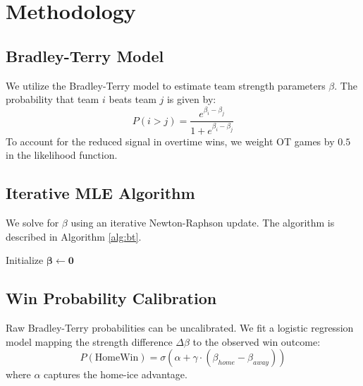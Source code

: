 \documentclass[conference]{IEEEtran}
\begin{document}
\section{Methodology}
\label{sec:method}

\subsection{Bradley-Terry Model}
We utilize the Bradley-Terry model \cite{bradley1952rank} to estimate team strength parameters $\beta$. The probability that team $i$ beats team $j$ is given by:
\begin{equation}
    P(i > j) = \frac{e^{\beta_i - \beta_j}}{1 + e^{\beta_i - \beta_j}}
    \label{eq:bt}
\end{equation}
To account for the reduced signal in overtime wins, we weight OT games by $0.5$ in the likelihood function.

\subsection{Iterative MLE Algorithm}
We solve for $\beta$ using an iterative Newton-Raphson update. The algorithm is described in Algorithm \ref{alg:bt}.

\begin{algorithm}[h]
\SetAlgoLined
{}
 Initialize $\boldsymbol{\beta} \leftarrow \mathbf{0}$\;
 \caption{Iterative MLE for Bradley-Terry}
 \label{alg:bt}
\end{algorithm}

\subsection{Win Probability Calibration}
Raw Bradley-Terry probabilities can be uncalibrated. We fit a logistic regression model mapping the strength difference $\Delta \beta$ to the observed win outcome:
\begin{equation}
    P(\text{HomeWin}) = \sigma(\alpha + \gamma \cdot (\beta_{home} - \beta_{away}))
\end{equation}
where $\alpha$ captures the home-ice advantage.
\end{document}
